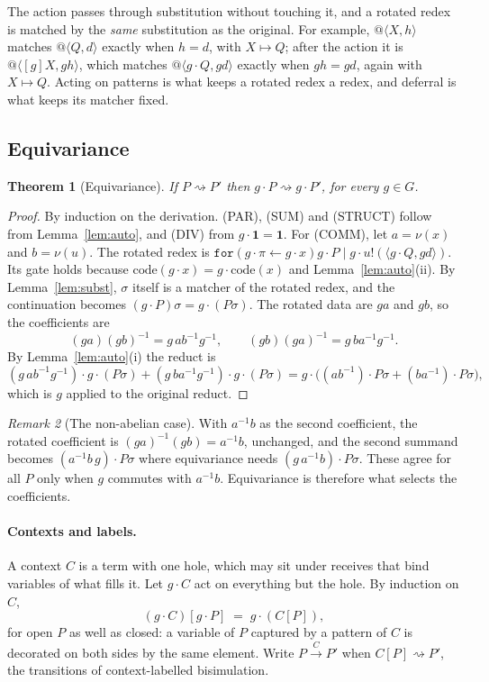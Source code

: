 \documentclass[11pt]{article}
\makeatletter
\newtheorem{theorem}{Theorem}[section]
\theoremstyle{definition}
\theoremstyle{remark}
\newtheorem{remark}[theorem]{Remark}
\newcommand{\chaos}{\mathbf{1}}
\newcommand{\rcv}[3]{\mathtt{for}(#1 \leftarrow #2)#3}
\newcommand{\out}[3]{#1!(\langle #2, #3\rangle)}
\newcommand{\qn}[2]{@\langle #1, #2\rangle}
\newcommand{\act}[2]{#1\cdot #2}
\newcommand{\red}{\rightsquigarrow}
\newcommand{\code}{\mathrm{code}}
\newcommand{\fr}[2]{[#1]#2}
\makeatother
\begin{document}
The action passes through substitution without touching it, and a rotated
redex is matched by the \emph{same} substitution as the original. For example,
$\qn{X}{h}$ matches $\qn{Q}{d}$ exactly when $h=d$, with $X\mapsto Q$; after
the action it is $\qn{\fr{g}{X}}{gh}$, which matches $\qn{\act{g}{Q}}{gd}$
exactly when $gh=gd$, again with $X\mapsto Q$. Acting on patterns is what keeps
a rotated redex a redex, and deferral is what keeps its matcher fixed.

\subsection{Equivariance}

\begin{theorem}[Equivariance]\label{thm:equivariance}
If $P\red P'$ then $\act{g}{P}\red\act{g}{P'}$, for every $g\in G$.
\end{theorem}

\begin{proof}
By induction on the derivation. (PAR), (SUM) and (STRUCT) follow from
Lemma~\ref{lem:auto}, and (DIV) from $\act{g}{\chaos}=\chaos$. For (COMM), let
$a=\nu(x)$ and $b=\nu(u)$. The rotated redex is
$\rcv{\act{g}{\pi}}{\act{g}{x}}{\act{g}{P}}\mid\out{\act{g}{u}}{\act{g}{Q}}{gd}$.
Its gate holds because $\code(\act{g}{x})=\act{g}{\code(x)}$ and
Lemma~\ref{lem:auto}(ii). By Lemma~\ref{lem:subst}, $\sigma$ itself is a
matcher of the rotated redex, and the continuation becomes
$(\act{g}{P})\sigma=\act{g}{(P\sigma)}$. The rotated data are $ga$
and $gb$, so the coefficients are
\[
(ga)(gb)^{-1}=g\,ab^{-1}g^{-1},
\qquad
(gb)(ga)^{-1}=g\,ba^{-1}g^{-1}.
\]
By Lemma~\ref{lem:auto}(i) the reduct is
\[
\act{(g\,ab^{-1}g^{-1})}{\act{g}{(P\sigma)}}
+\act{(g\,ba^{-1}g^{-1})}{\act{g}{(P\sigma)}}
=\act{g}{\bigl(\act{(ab^{-1})}{P\sigma}+\act{(ba^{-1})}{P\sigma}\bigr)},
\]
which is $g$ applied to the original reduct.
\end{proof}

\begin{remark}[The non-abelian case]\label{rem:nonabelian}
With $a^{-1}b$ as the second coefficient, the rotated coefficient is
$(ga)^{-1}(gb)=a^{-1}b$, unchanged, and the second summand becomes
$\act{(a^{-1}b\,g)}{P\sigma}$ where equivariance needs
$\act{(g\,a^{-1}b)}{P\sigma}$. These agree for all $P$ only when $g$ commutes
with $a^{-1}b$. Equivariance is therefore what selects the coefficients.
\end{remark}

\paragraph{Contexts and labels.}
A context $C$ is a term with one hole, which may sit under receives that bind
variables of what fills it. Let $\act{g}{C}$ act on everything but the hole.
By induction on $C$,
\[
(\act{g}{C})[\act{g}{P}] \;=\; \act{g}{(C[P])},
\]
for open $P$ as well as closed: a variable of $P$ captured by a pattern of $C$
is decorated on both sides by the same element. Write
$P\xrightarrow{C}P'$ when $C[P]\red P'$, the transitions of context-labelled
bisimulation.
\end{document}
